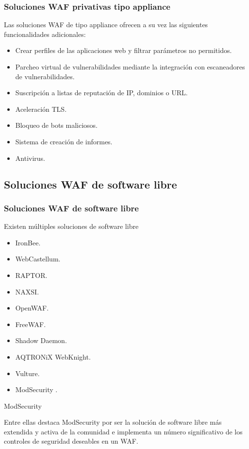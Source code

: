 \begin{frame}[shrink]
  \frametitle{Soluciones WAF privativas tipo appliance}
  Las soluciones WAF de tipo appliance ofrecen a su vez las siguientes funcionalidades adicionales:
  \begin{itemize}
    \item Crear perfiles de las aplicaciones web y filtrar parámetros no permitidos.
    \item Parcheo virtual de vulnerabilidades mediante la integración con escaneadores de vulnerabilidades.
    \item Suscripción a listas de reputación de IP, dominios o URL.
    \item Aceleración TLS.
    \item Bloqueo de bots maliciosos.
    \item Sistema de creación de informes.
    \item Antivirus.
  \end{itemize}
\end{frame}

\subsection{Soluciones WAF de software libre}
\begin{frame}[shrink]
  \frametitle{Soluciones WAF de software libre}
  Existen múltiples soluciones de software libre
  \begin{itemize}
    \item IronBee\cite{IronBee}.
    \item WebCastellum\cite{WebCastellum}.
    \item RAPTOR\cite{raptor}.
    \item NAXSI\cite{NAXSI}.
    \item OpenWAF\cite{openwaf}.
    \item FreeWAF\cite{freewaf}.
    \item Shadow Daemon\cite{ShadowDaemon}.
    \item AQTRONiX WebKnight\cite{WebKnight}.
    \item Vulture\cite{vulture}.
    \item ModSecurity \cite{modsecurity}.
  \end{itemize}
  \begin{block}{ModSecurity}
  \par Entre ellas destaca ModSecurity por ser la solución de software libre más extendida y activa de la comunidad e implementa un número significativo de los controles de seguridad deseables en un WAF.
  \end{block}
\end{frame}

